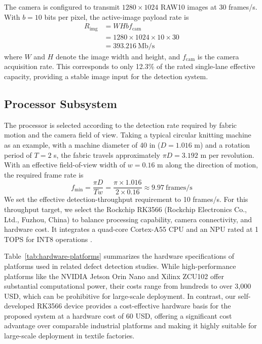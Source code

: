 \documentclass[journal]{IEEEtranTIE}
\begin{document}
The camera is configured to transmit $1280\times1024$ RAW10 images at 30 frames/s. With $b=10$ bits per pixel, the active-image payload rate is
\begin{equation}
\begin{aligned}
R_{\mathrm{img}} &= W H b f_{\mathrm{cam}} \\
&=1280\times1024\times10\times30 \\
&=393.216\ \mathrm{Mb/s}
\end{aligned}
\label{eq:serdes-bandwidth}
\end{equation}
\noindent where $W$ and $H$ denote the image width and height, and $f_{\mathrm{cam}}$ is the camera acquisition rate. This corresponds to only 12.3\% of the rated single-lane effective capacity, providing a stable image input for the detection system.

\subsection{Processor Subsystem}
\label{sec:coverage}
The processor is selected according to the detection rate required by fabric motion and the camera field of view. Taking a typical circular knitting machine as an example, with a machine diameter of 40 in ($D=1.016$ m) and a rotation period of $T=2$ s, the fabric travels approximately $\pi D=3.192$ m per revolution. With an effective field-of-view width of $w=0.16$ m along the direction of motion, the required frame rate is
\begin{equation}
f_{\min}=\frac{\pi D}{Tw}
=\frac{\pi\times1.016}{2\times0.16}
\approx9.97\ \mathrm{frames/s}
\label{eq:coverage-rate}
\end{equation}
\noindent We set the effective detection-throughput requirement to 10 frames/s. For this throughput target, we select the Rockchip RK3566 (Rockchip Electronics Co., Ltd., Fuzhou, China) to balance processing capability, camera connectivity, and hardware cost. It integrates a quad-core Cortex-A55 CPU and an NPU rated at 1 TOPS for INT8 operations \cite{rockchiprk3566}.

Table~\ref{tab:hardware-platforms} summarizes the hardware specifications of platforms used in related defect detection studies. While high-performance platforms like the NVIDIA Jetson Orin Nano and Xilinx ZCU102 offer substantial computational power, their costs range from hundreds to over 3,000 USD, which can be prohibitive for large-scale deployment. In contrast, our self-developed RK3566 device provides a cost-effective hardware basis for the proposed system at a hardware cost of 60 USD, offering a significant cost advantage over comparable industrial platforms and making it highly suitable for large-scale deployment in textile factories.
\end{document}
